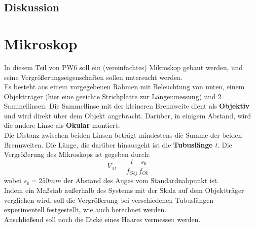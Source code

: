\documentclass[12pt,a4paper]{article}
\begin{document}
\begin{multicols}{2}

\subsection{Diskussion}

\section{Mikroskop}

In diesem Teil von PW6 soll ein (vereinfachtes) Mikroskop gebaut werden, und seine Vergrößerungseigenschaften sollen untersucht werden.\\
Es besteht aus einem vorgegebenen Rahmen mit Beleuchtung von unten, einem Objektträger (hier eine geeichte Strichplatte zur Längenmessung) und 2 Sammellinsen. Die Sammellinse mit der kleineren Brennweite dient als \textbf{Objektiv} und wird direkt über dem Objekt angebracht. Darüber, in einigem Abstand, wird die andere Linse als \textbf{Okular} montiert.\\
Die Distanz zwischen beiden Linsen beträgt mindestens die Summe der beiden Brennweiten. Die Länge, die darüber hinausgeht ist die \textbf{Tubuslänge $t$}.
Die Vergrößerung des Mikroskops ist gegeben durch:
$$V_M=\frac{t}{f_{Obj}}\frac{s_0}{f_{Ok}}$$
wobei $s_0=250mm$ der Abstand des Auges vom Standardnahpunkt ist.\\
Indem ein Maßstab außerhalb des Systems mit der Skala auf dem Objektträger verglichen wird, soll die Vergrößerung bei verschiedenen Tubuslängen experimentell festgestellt, wie auch berechnet werden.\\
Anschließend soll noch die Dicke eines Haares vermessen werden.


\end{multicols}
\end{document}
